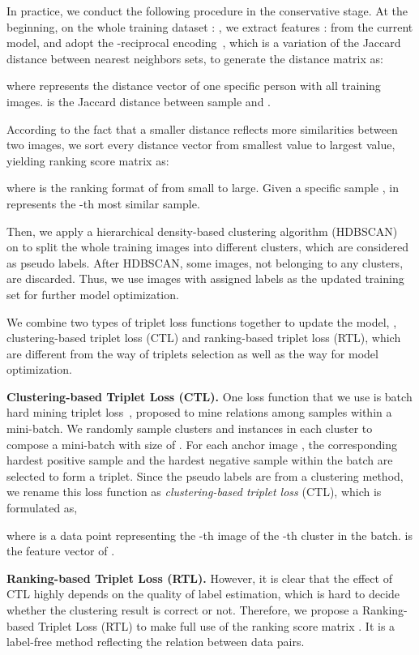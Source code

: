 \documentclass[10pt,twocolumn,letterpaper]{article}
\begin{document}
In practice, we conduct the following procedure in the conservative stage. At the beginning, on the whole training dataset : , we extract features :  from the current model, and adopt the -reciprocal encoding~\cite{rerank}, which is a variation of the Jaccard distance between nearest neighbors sets, to generate the distance matrix  as:
    
where  represents the distance vector of one specific person  with all training images.  is the Jaccard distance between sample  and .

According to the fact that a smaller distance reflects more similarities between two images, we sort every distance vector  from smallest value to largest value, yielding ranking score matrix  as:

where  is the ranking format of  from small to large. Given a specific sample ,  in  represents the -th most similar sample.

Then, we apply a hierarchical density-based clustering algorithm (HDBSCAN)~\cite{HDBSCAN} on  to split the whole training images into different clusters, which are considered as pseudo labels. After HDBSCAN, some images, not belonging to any clusters, are discarded. Thus, we use images with assigned labels as the updated training set  for further model optimization. 

We combine two types of triplet loss functions together to update the model, \ie,  clustering-based triplet loss (CTL) and ranking-based triplet loss (RTL), which are different from the way of triplets selection as well as the way for model optimization. 

\textbf{Clustering-based Triplet Loss (CTL).} One loss function that we use is batch hard mining triplet loss~\cite{batchhardtriplet}, proposed to mine relations among samples within a mini-batch. We randomly sample  clusters and  instances in each cluster to compose a mini-batch with size of . For each anchor image , the corresponding hardest positive sample  and the hardest negative sample  within the batch are selected to form a triplet. Since the pseudo labels are from a clustering method, we rename this loss function as \emph{clustering-based triplet loss} (CTL), which is formulated as,

where  is a data point representing the -th image of the -th cluster in the batch.  is the feature vector of . 

\textbf{Ranking-based Triplet Loss (RTL).}
However, it is clear that the effect of CTL highly depends on the quality of label estimation, which is hard to decide whether the clustering result is correct or not. 
Therefore, we propose a Ranking-based Triplet Loss (RTL) to make full use of the ranking score matrix . It is a label-free method reflecting the relation between data pairs.
\end{document}

